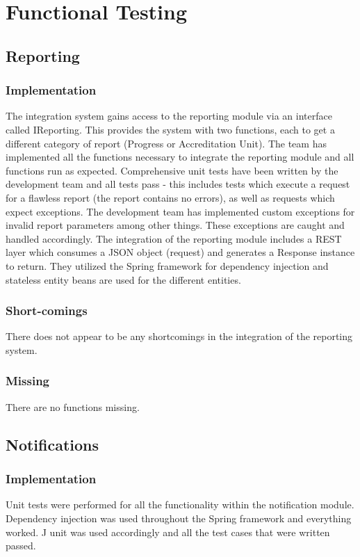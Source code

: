 \documentclass{article}
\begin{document}
\section{Functional Testing}
    \subsection{Reporting}
        \subsubsection{Implementation}
        The integration system gains access to the reporting module via an interface called IReporting. This provides the system with two functions, each to get a different category of report (Progress or Accreditation Unit). The team has implemented all the functions necessary to integrate the reporting module and all functions run as expected. Comprehensive unit tests have been written by the development team and all tests pass - this includes tests which execute a request for a flawless report (the report contains no errors), as well as requests which expect exceptions. The development team has implemented custom exceptions for invalid report parameters among other things. These exceptions are caught and handled accordingly. The integration of the reporting module includes a REST layer which consumes a JSON object (request) and generates a Response instance to return. They utilized the Spring framework for dependency injection and stateless entity beans are used for the different entities.
        \subsubsection{Short-comings}
        There does not appear to be any shortcomings in the integration of the reporting system.
        \subsubsection{Missing}
        There are no functions missing.
        
    \subsection{Notifications}
        \subsubsection{Implementation}
        Unit tests were performed for all the functionality within the notification module. Dependency injection was used throughout the Spring framework and everything worked. J unit was used accordingly and all the test cases that were written passed.
\end{document}
